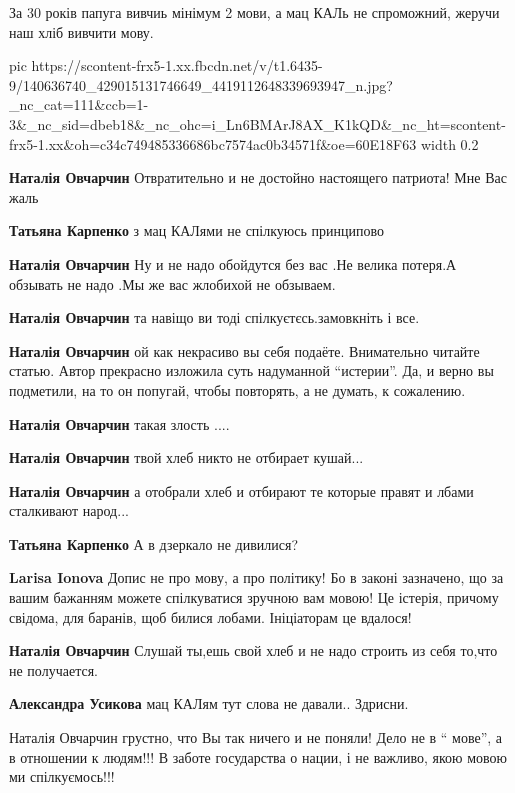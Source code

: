 За 30 років папуга вивчиь мінімум 2 мови, а мац КАЛь не спроможний, жеручи наш хліб вивчити мову.

\ifcmt
  pic https://scontent-frx5-1.xx.fbcdn.net/v/t1.6435-9/140636740_429015131746649_4419112648339693947_n.jpg?_nc_cat=111&ccb=1-3&_nc_sid=dbeb18&_nc_ohc=i_Ln6BMArJ8AX_K1kQD&_nc_ht=scontent-frx5-1.xx&oh=c34c749485336686bc7574ac0b34571f&oe=60E18F63
  width 0.2
\fi

\begin{itemize}
\textbf{Наталія Овчарчин} Отвратительно и не достойно настоящего патриота! Мне Вас жаль

\textbf{Татьяна Карпенко} з мац КАЛями не спілкуюсь принципово

\textbf{Наталія Овчарчин} Ну и не надо обойдутся без вас .Не велика потеря.А обзывать не надо .Мы же вас жлобихой не обзываем.

\textbf{Наталія Овчарчин} та навіщо ви тоді спілкуєтєсь.замовкніть і все.

\textbf{Наталія Овчарчин} ой как некрасиво вы себя подаёте. Внимательно читайте
статью. Автор прекрасно изложила суть надуманной \enquote{истерии}. Да, и верно вы
подметили, на то он попугай, чтобы повторять, а не думать, к сожалению.

\textbf{Наталія Овчарчин} такая злость ....

\textbf{Наталія Овчарчин} твой хлеб никто не отбирает кушай...

\textbf{Наталія Овчарчин} а отобрали хлеб и отбирают те которые правят и лбами сталкивают народ...

\textbf{Татьяна Карпенко} А в дзеркало не дивилися?

\textbf{Larisa Ionova} Допис не про мову, а про політику! Бо в законі
зазначено, що за вашим бажанням можете спілкуватися зручною вам мовою! Це
істерія, причому свідома, для баранів, щоб билися лобами. Ініціаторам це
вдалося!

\textbf{Наталія Овчарчин} Слушай ты,ешь свой хлеб и не надо строить из себя то,что не получается.

\textbf{Александра Усикова} мац КАЛям тут слова не давали.. Здрисни.

Наталія Овчарчин грустно, что Вы так ничего и не поняли! Дело не в \enquote{ мове}, а в
отношении к людям!!! В заботе государства о нации, і не важливо, якою мовою ми
спілкуємось!!!


\end{itemize}

